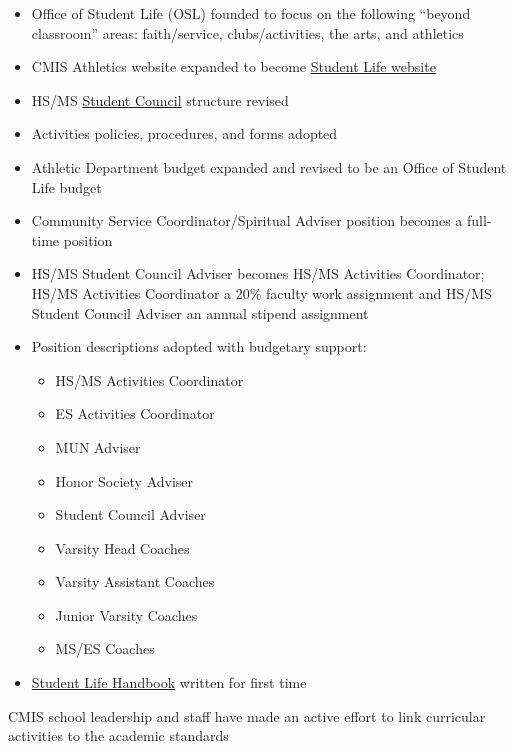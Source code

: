 \begin{findings}
\begin{itemize}
\item Office of Student Life (OSL) founded to focus on the following “beyond classroom” areas: faith/service, clubs/activities, the arts, and athletics
\item CMIS Athletics website expanded to become \href{http://blogs.cmis.ac.th/eagles/}{Student Life website}
\item HS/MS \href{http://blogs.cmis.ac.th/eagles/clubs-activities/ms-hs/stuco/}{Student Council} structure revised
\item Activities policies, procedures, and forms adopted
\end{itemize}

\begin{itemize}
\item Athletic Department budget expanded and revised to be an Office of Student Life budget
\item Community Service Coordinator/Spiritual Adviser position becomes a full-time position
\item HS/MS Student Council Adviser becomes HS/MS Activities Coordinator; HS/MS Activities Coordinator a 20\% faculty work assignment and HS/MS Student Council Adviser an annual stipend assignment
\item Position descriptions adopted with budgetary support:
\begin{itemize}
\item HS/MS Activities Coordinator
\item ES Activities Coordinator
\item MUN Adviser
\item Honor Society Adviser
\item Student Council Adviser
\item Varsity Head Coaches
\item Varsity Assistant Coaches
\item Junior Varsity Coaches
\item MS/ES Coaches
\end{itemize}
\item \href{https://drive.google.com/open?id=1xqBFIjl7jeaT2qJR0Fxga71sfk0juq6pZzDbk8EOibI}{Student Life Handbook} written for first time
\end{itemize}


CMIS school leadership and staff have made an active effort to link curricular activities to the academic standards


\end{findings}
